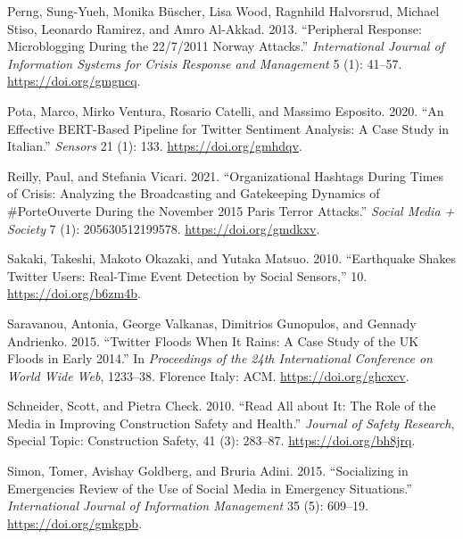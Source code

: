 \documentclass[a4paper, notitlepage]{extreport}
\newlength{\cslhangindent}
\newenvironment{CSLReferences}[2] %
 {%
  \setlength{\parindent}{0pt}
  \ifodd #1 \everypar{\setlength{\hangindent}{\cslhangindent}}\ignorespaces\fi
  \ifnum #2 > 0
  \setlength{\parskip}{#2\baselineskip}
  \fi
 }%
 {}
\begin{document}
\begin{CSLReferences}{1}{0}
\leavevmode{}%
Perng, Sung-Yueh, Monika Büscher, Lisa Wood, Ragnhild Halvorsrud,
Michael Stiso, Leonardo Ramirez, and Amro Al-Akkad. 2013. {``Peripheral
{Response}: {Microblogging During} the 22/7/2011 {Norway Attacks}.''}
\emph{International Journal of Information Systems for Crisis Response
and Management} 5 (1): 41--57. \url{https://doi.org/gmgncq}.

\leavevmode{}%
Pota, Marco, Mirko Ventura, Rosario Catelli, and Massimo Esposito. 2020.
{``An {Effective BERT}-{Based Pipeline} for {Twitter Sentiment
Analysis}: {A Case Study} in {Italian}.''} \emph{Sensors} 21 (1): 133.
\url{https://doi.org/gmhdqv}.

\leavevmode{}%
Reilly, Paul, and Stefania Vicari. 2021. {``Organizational {Hashtags
During Times} of {Crisis}: {Analyzing} the {Broadcasting} and
{Gatekeeping Dynamics} of \#{PorteOuverte During} the {November} 2015
{Paris Terror Attacks}.''} \emph{Social Media + Society} 7 (1):
205630512199578. \url{https://doi.org/gmdkxv}.

\leavevmode{}%
Sakaki, Takeshi, Makoto Okazaki, and Yutaka Matsuo. 2010. {``Earthquake
Shakes {Twitter} Users: Real-Time Event Detection by Social Sensors,''}
10. \url{https://doi.org/b6zm4b}.

\leavevmode{}%
Saravanou, Antonia, George Valkanas, Dimitrios Gunopulos, and Gennady
Andrienko. 2015. {``Twitter {Floods} When It {Rains}: {A Case Study} of
the {UK Floods} in Early 2014.''} In \emph{Proceedings of the 24th
{International Conference} on {World Wide Web}}, 1233--38. {Florence
Italy}: {ACM}. \url{https://doi.org/ghcxcv}.

\leavevmode{}%
Schneider, Scott, and Pietra Check. 2010. {``Read All about It: {The}
Role of the Media in Improving Construction Safety and Health.''}
\emph{Journal of Safety Research}, Special {Topic}: {Construction
Safety}, 41 (3): 283--87. \url{https://doi.org/bh8jrq}.

\leavevmode{}%
Simon, Tomer, Avishay Goldberg, and Bruria Adini. 2015. {``Socializing
in Emergencies Review of the Use of Social Media in
Emergency Situations.''} \emph{International Journal of Information
Management} 35 (5): 609--19. \url{https://doi.org/gmkgpb}.


\end{CSLReferences}
\end{document}
